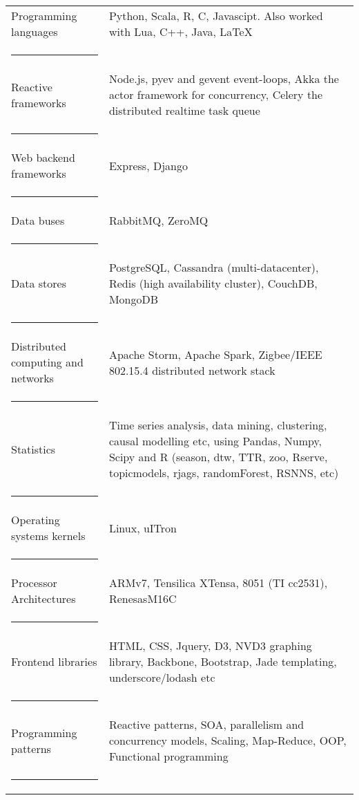 \documentclass[10pt]{article} %
\begin{document}
\normalsize
\begin{tabularx}{\textwidth}{>{\setlength\hsize{0.7\hsize}}X >{\setlength\hsize{1.3\hsize}}X}
	Programming languages & Python, Scala, R, C, Javascipt. Also worked with Lua, C++, Java, \LaTeX \\
	\textcolor{Emerald}{\rule{16cm}{0.2pt}}\\

	Reactive frameworks & Node.js, pyev and gevent event-loops, Akka the actor framework for concurrency, Celery the distributed realtime task queue \\
	\textcolor{Emerald}{\rule{16cm}{0.2pt}}\\

	Web backend frameworks & Express, Django \\
	\textcolor{Emerald}{\rule{16cm}{0.2pt}}\\

	Data buses & RabbitMQ, ZeroMQ\\
	\textcolor{Emerald}{\rule{16cm}{0.2pt}}\\

	Data stores & PostgreSQL, Cassandra (multi-datacenter), Redis (high availability cluster), CouchDB, MongoDB \\
	\textcolor{Emerald}{\rule{16cm}{0.2pt}}\\

	Distributed computing \newline and networks & Apache Storm, Apache Spark, Zigbee/IEEE 802.15.4 distributed network stack \\
	\textcolor{Emerald}{\rule{16cm}{0.2pt}}\\

	Statistics & Time series analysis, data mining, clustering, causal modelling etc, using Pandas, Numpy, Scipy and R (season, dtw, TTR, zoo, Rserve, topicmodels, rjags, randomForest, RSNNS, etc)\\
	\textcolor{Emerald}{\rule{16cm}{0.2pt}}\\

	Operating systems kernels & Linux, uITron \\
	\textcolor{Emerald}{\rule{16cm}{0.2pt}}\\

	Processor Architectures & ARMv7, Tensilica XTensa, 8051 (TI cc2531), RenesasM16C \\
	\textcolor{Emerald}{\rule{16cm}{0.2pt}}\\

	Frontend libraries & HTML, CSS, Jquery, D3, NVD3 graphing library, Backbone, Bootstrap, Jade templating, underscore/lodash etc \\
	\textcolor{Emerald}{\rule{16cm}{0.2pt}}\\

	Programming patterns & Reactive patterns, SOA, parallelism and concurrency models, \newline Scaling, Map-Reduce, OOP, Functional programming \\
	\textcolor{Emerald}{\rule{16cm}{0.2pt}}\\

\end{tabularx}
\newline
\newline
\end{document}
